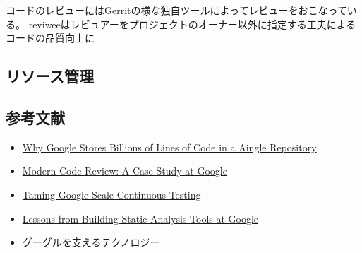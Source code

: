 コードのレビューにはGerritの様な独自ツールによってレビューをおこなっている。
reviweeはレビュアーをプロジェクトのオーナー以外に指定する工夫によるコードの品質向上に
\subsection*{リソース管理}
\subsection*{参考文献}
\begin{itemize}
\item \href{https://ai.google/research/pubs/pub45424}{Why Google Stores Billions of Lines of Code in a Aingle Repository}
\item \href{https://ai.google/research/pubs/pub47025}{Modern Code Review: A Case Study at Google}
\item \href{https://ai.google/research/pubs/pub45861}{Taming Google-Scale Continuous Testing}
\item \href{https://ai.google/research/pubs/pub46576}{Lessons from Building Static Analysis Tools at Google}
\item \href{https://www.school.ctc-g.co.jp/columns/nakai2/}{グーグルを支えるテクノロジー}
\end{itemize}
